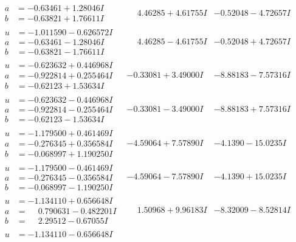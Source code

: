 \documentclass[1p]{elsarticle_modified}
\theoremstyle{definition}
\begin{document}
$$\begin{array}{c|c|c}
\begin{aligned}
a &= -0.63461 + 1.28046 I \\
b &= -0.63821 + 1.76611 I\end{aligned}
 & \phantom{-}4.46285 + 4.61755 I & -0.52048 - 4.72657 I \\ \hline\begin{aligned}
u &= -1.011590 - 0.626572 I \\
a &= -0.63461 - 1.28046 I \\
b &= -0.63821 - 1.76611 I\end{aligned}
 & \phantom{-}4.46285 - 4.61755 I & -0.52048 + 4.72657 I \\ \hline\begin{aligned}
u &= -0.623632 + 0.446968 I \\
a &= -0.922814 + 0.255464 I \\
b &= -0.62123 + 1.53634 I\end{aligned}
 & -0.33081 + 3.49000 I & -8.88183 - 7.57316 I \\ \hline\begin{aligned}
u &= -0.623632 - 0.446968 I \\
a &= -0.922814 - 0.255464 I \\
b &= -0.62123 - 1.53634 I\end{aligned}
 & -0.33081 - 3.49000 I & -8.88183 + 7.57316 I \\ \hline\begin{aligned}
u &= -1.179500 + 0.461469 I \\
a &= -0.276345 + 0.356584 I \\
b &= -0.068997 + 1.190250 I\end{aligned}
 & -4.59064 + 7.57890 I & -4.1390 - 15.0235 I \\ \hline\begin{aligned}
u &= -1.179500 - 0.461469 I \\
a &= -0.276345 - 0.356584 I \\
b &= -0.068997 - 1.190250 I\end{aligned}
 & -4.59064 - 7.57890 I & -4.1390 + 15.0235 I \\ \hline\begin{aligned}
u &= -1.134110 + 0.656648 I \\
a &= \phantom{-}0.790631 - 0.482201 I \\
b &= \phantom{-}2.29512 - 0.67055 I\end{aligned}
 & \phantom{-}1.50968 + 9.96183 I & -8.32009 - 8.52814 I \\ \hline\begin{aligned}
u &= -1.134110 - 0.656648 I \\

\end{aligned}
\end{array}$$
\end{document}
